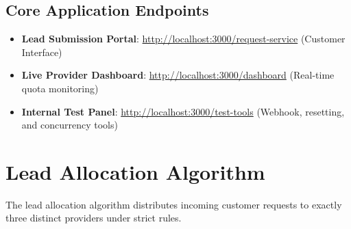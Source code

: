 \documentclass[11pt,a4paper]{article}
\begin{document}
\subsection{Core Application Endpoints}
\begin{itemize}
    \item \textbf{Lead Submission Portal}: \url{http://localhost:3000/request-service} (Customer Interface)
    \item \textbf{Live Provider Dashboard}: \url{http://localhost:3000/dashboard} (Real-time quota monitoring)
    \item \textbf{Internal Test Panel}: \url{http://localhost:3000/test-tools} (Webhook, resetting, and concurrency tools)
\end{itemize}

\newpage

\section{Lead Allocation Algorithm}

The lead allocation algorithm distributes incoming customer requests to exactly three distinct providers under strict rules.
\end{document}
